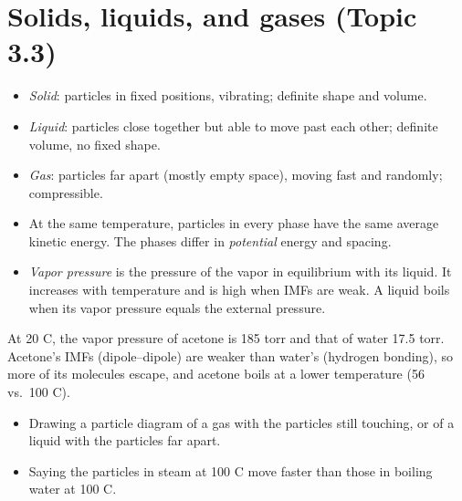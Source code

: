 \documentclass[11pt]{article}
\begin{document}
\section{Solids, liquids, and gases (Topic 3.3)}\label{t:3.3}
\begin{itemize}
\item \emph{Solid}: particles in fixed positions, vibrating; definite shape and volume.
\item \emph{Liquid}: particles close together but able to move past each other; definite volume, no fixed shape.
\item \emph{Gas}: particles far apart (mostly empty space), moving fast and randomly; compressible.
\item At the same temperature, particles in every phase have the same average kinetic energy. The phases differ in \emph{potential} energy and spacing.
\item \emph{Vapor pressure} is the pressure of the vapor in equilibrium with its liquid. It increases with temperature and is high when IMFs are weak. A liquid boils when its vapor pressure equals the external pressure.
\end{itemize}
 At 20 \textdegree C, the vapor pressure of acetone is 185 torr and that of water 17.5 torr. Acetone's IMFs (dipole--dipole) are weaker than water's (hydrogen bonding), so more of its molecules escape, and acetone boils at a lower temperature (56 vs.\ 100 \textdegree C).

\errorsh
\begin{itemize}
\item Drawing a particle diagram of a gas with the particles still touching, or of a liquid with the particles far apart.
\item Saying the particles in steam at 100 \textdegree C move faster than those in boiling water at 100 \textdegree C.
\end{itemize}
\end{document}
